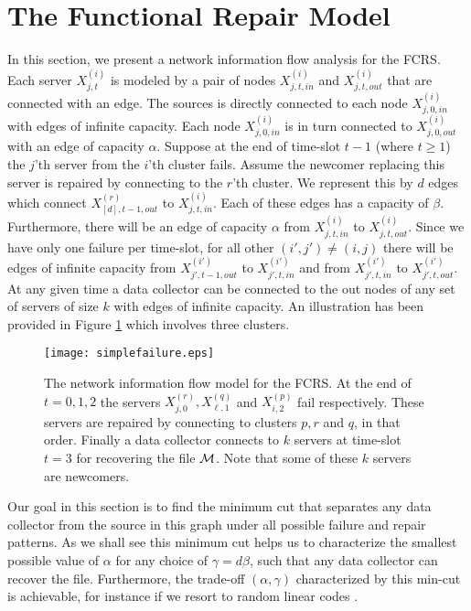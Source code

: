 \documentclass[journal,onecolumn,draftcls]{IEEEtran}
\begin{document}
\section{The Functional Repair Model}
\label{sec:functional}
In this section, we present a network information flow analysis for the FCRS. Each server $X^{(i)}_{j,t}$ is modeled by a pair of nodes $X^{(i)}_{j,t,in}$ and $X^{(i)}_{j,t,out}$ that are connected with an edge. The sources is directly connected to each node $X^{(i)}_{j,0,in}$ with edges of infinite capacity. Each node $X^{(i)}_{j,0,in}$ is in turn connected to $X^{(i)}_{j,0,out}$ with an edge of capacity $\alpha$. Suppose at the end of time-slot $t-1$ (where $t\ge 1$) the $j$'th server from the $i$'th cluster fails. Assume the newcomer replacing this server is repaired by connecting to the $r$'th cluster. We represent this by $d$ edges which connect $X^{(r)}_{[d],t-1,out}$ to $X^{(i)}_{j,t,in}$. Each of these edges has a capacity of $\beta$. Furthermore, there will be an edge of capacity $\alpha$ from $X^{(i)}_{j,t,in}$ to $X^{(i)}_{j,t,out}$. Since we have only one failure per time-slot, for all other $(i',j')\neq(i,j)$ there will be edges of infinite capacity from $X^{(i')}_{j',t-1,out}$ to $X^{(i')}_{j',t,in}$ and from $X^{(i')}_{j',t,in}$ to $X^{(i')}_{j',t,out}$. At any given time a data collector can be connected to the out nodes of any set of servers of size $k$ with edges of infinite capacity. An illustration has been provided in Figure \ref{fig:evolution3failures} which involves three clusters.  \begin{figure}[h]
\centering
\texttt{[image: simplefailure.eps]} 
\caption{The network information flow model for the FCRS. At the end of $t = 0,1,2$ the servers $X^{(r)}_{j,0}, X^{(q)}_{\ell,1}$ and $X^{(p)}_{i,2}$  fail respectively. These servers are repaired by connecting to clusters $p,r$ and $q$, in that order. Finally a data collector connects to $k$ servers at time-slot $t = 3$ for recovering the file ${\cal M}$. Note that some of these $k$ servers are newcomers.}
\label{fig:evolution3failures}
\end{figure}

Our goal in this section is to find the minimum cut that separates any data collector from the source in this graph under all possible failure and repair patterns. As we shall see this minimum cut helps us to characterize the smallest possible value of $\alpha$ for any choice of $\gamma = d\beta$, such that any data collector can recover the file. Furthermore, the trade-off $(\alpha,\gamma)$ characterized by this min-cut is achievable, for instance if we resort to random linear codes \cite{ho2006random}. 
\end{document}
